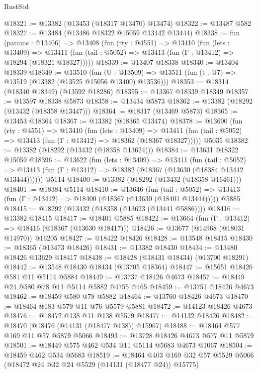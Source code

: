 \begin{lexlean}{RustStd}
\begin{coremodule}
@18321 := @13382 (@13453 (@18317 @13470) @13474)
@18322 := @13487 @582
@18327 := @13484 (@13486 @18322 @15059 @13442 @13444)
@18338 := fun (params : @13406) =>
  @13408
    (fun (rty : @4551) =>
    @13410
      (fun (lets : @13409) =>
      @13411 (fun (tail : @5052) => @13413 (fun (Γ : @13412) => @18294 (@18321 @18327)))))
@18339 := @13407 @18338
@18340 := @13404 @18339
@18349 := @13510
    (fun (U : @13509) => @13511 (fun (t : @7) => @13519 (@13382 (@13525 @15056 @13400) @13536)))
@18353 := @18314 (@18340 @18349) (@13592 @18286)
@18355 := @13367 @18339 @18349
@18357 := @13597 @18338 @5873
@18358 := @13434 @5873
@18362 := @13382 (@18292 (@13432 (@18358 @13447)))
@18364 := @18317 (@13469 @5873)
@18365 := @13453 @18364
@18367 := @13382 (@18365 @13474)
@18378 := @13600
    (fun (rty : @4551) =>
    @13410
      (fun (lets : @13409) =>
      @13411 (fun (tail : @5052) => @13413 (fun (Γ : @13412) => @18362 (@18367 @18327)))))
    @5035
@18382 := @13382 (@18292 (@13432 (@18358 @13624)))
@18384 := @13631 @18322 @15059
@18396 := @13622
    (fun (lets : @13409) =>
    @13411
      (fun (tail : @5052) =>
      @13413 (fun (Γ : @13412) => @18382 (@18367 (@13630 (@18384 @13442 @13444))))))
    @5114
@18400 := @13382 (@18292 (@13432 (@18358 @16461)))
@18401 := @18384 @5114
@18410 := @13646
    (fun (tail : @5052) => @13413 (fun (Γ : @13412) => @18400 (@18367 (@13630 (@18401 @13444)))))
    @5885
@18415 := @18292 (@13432 (@18358 (@13623 (@13441 @5886))))
@18416 := @13382 @18415
@18417 := @18401 @5885
@18422 := @13664 (fun (Γ : @13412) => @18416 (@18367 (@13630 @18417)))
@18426 := @13677 (@14968 (@18031 @14970)) @16205
@18427 := @18422 @18426
@18428 := @13548 @18415
@18430 := @18365 (@13473 @18426)
@18431 := @13382 @18430
@18434 := @13480 @18426 @13629 @18417
@18438 := @18428 (@18431 @18434) (@13700 @18291)
@18442 := @13548 @18430 @18434 (@13705 @18364)
@18447 := @15651 @18426 @581 @11 @5114 @5884
@18449 := @13737 @18426 @4673
@18457 := @18449 @24 @580 @78 @11 @5114 @5882 @4755 @465
@18459 := @13751 @18426 @4673
@18462 := @18459 @580 @78 @5882
@18464 := @13760 @18426 @4673
@18470 := @18464 @183 @579 @11 @76 @5579 @5881
@18472 := @14123 @18426 @4673
@18476 := @18472 @138 @11 @138 @5579
@18477 := @14132 @18426
@18482 := @18470 (@18476 (@14131 (@18477 @138)) @15967)
@18488 := @18464 @577 @169 @11 @57 @5879 @5066
@18493 := @13728 @18426 @4673 @577 @11 @5879
@18501 := @18449 @575 @462 @534 @11 @5114 @5683 @4673 @1067
@18504 := @18459 @462 @534 @5683
@18519 := @18464
    @403
    @169
    @32
    @57
    @5529
    @5066
    (@18472 @24 @32 @24 @5529 (@14131 (@18477 @24)) @15775)

\end{coremodule}
\end{lexlean}
